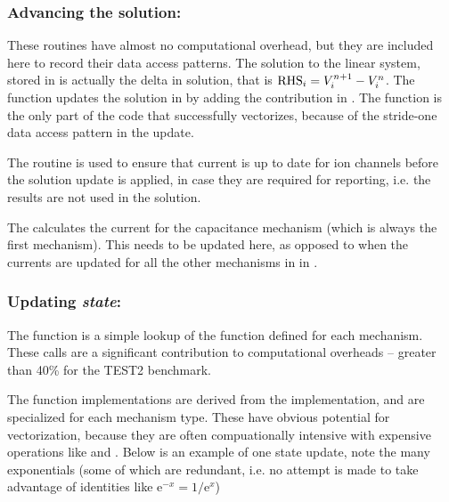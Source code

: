 
\subsubsection{Advancing the solution: }
These routines have almost no computational overhead, but they are included here to record their data access patterns.
The solution to the linear system, stored in  is actually the delta in solution, that is ${\text{RHS}}_{i} = {V}_{i}^{n+1} - {V}_{i}^{n}$.
The  function updates the solution in  by adding the contribution in .
The  function is the only part of the \neuron code that successfully vectorizes, because of the stride-one data access pattern in the update.

The  routine is used to ensure that current is up to date for ion channels before the solution update is applied, in case they are required for reporting, i.e. the results are not used in the solution.

The  calculates the current for the capacitance mechanism (which is always the first mechanism). This needs to be updated here, as opposed to when the currents are updated for all the other mechanisms in  in .

\subsubsection{Updating \emph{state}: }
The  function is a simple lookup of the  function defined for each mechanism. These calls are a significant contribution to computational overheads -- greater than 40\% for the TEST2 benchmark.


The  function implementations are derived from the \hoc implementation, and are specialized for each mechanism type. These have obvious potential for vectorization, because they are often compuationally intensive with expensive operations like  and . Below is an example of one state update, note the many exponentials (some of which are redundant, i.e. no attempt is made to take advantage of identities like $\text{e}^{-x}=1/\text{e}^{x}$)

